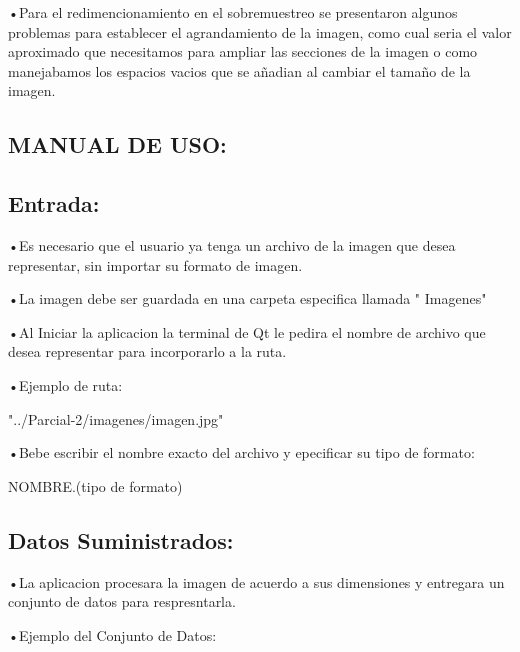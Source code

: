 \documentclass{article}
\begin{document}
 \vspace{1cm}
 
•Para el redimencionamiento en el sobremuestreo se presentaron algunos problemas para establecer el agrandamiento de la imagen, como cual seria  el valor aproximado que necesitamos para ampliar las secciones de la imagen  o como manejabamos los espacios vacios que se añadian al cambiar el tamaño de la imagen.


 \vspace{1cm}


 \vspace{8cm}
\begin{center}
\Huge
\section{MANUAL DE USO: }
\end{center}
\subsection{Entrada:}
•Es necesario que el usuario ya tenga un archivo de la imagen  que desea representar, sin importar su formato de imagen.

•La imagen debe ser guardada en una carpeta especifica llamada " Imagenes"

•Al Iniciar la aplicacion la terminal de Qt le pedira  el nombre de archivo  que desea representar para incorporarlo a la ruta.

•Ejemplo de ruta:
\vspace{0.3cm}

       "../Parcial-2/imagenes/imagen.jpg"
\vspace{0.3cm}

•Bebe escribir el nombre exacto del archivo y epecificar su tipo de formato:

\vspace{0.3cm}
          NOMBRE.(tipo de formato)

\subsection{Datos Suministrados:}

•La aplicacion procesara la imagen de acuerdo a sus dimensiones y entregara un conjunto de datos para respresntarla.
\vspace{0.2cm}

•Ejemplo del Conjunto de Datos:
\vspace{0.5cm}
\end{document}
